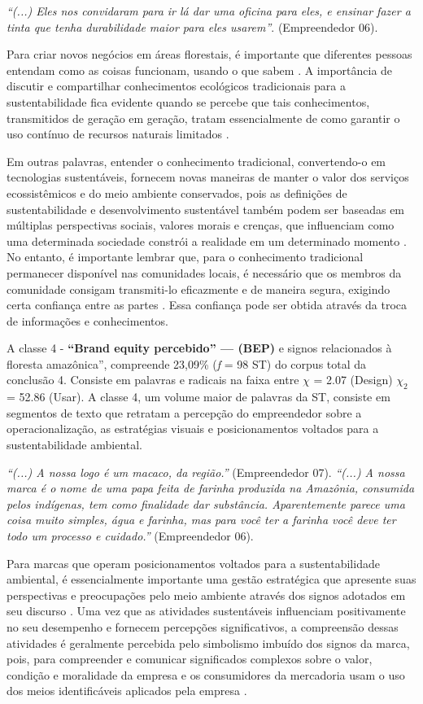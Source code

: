 \textit{“(...) Eles nos convidaram para ir lá dar uma oficina para eles, e ensinar fazer a tinta que tenha durabilidade maior para eles usarem”}. (Empreendedor 06).

Para criar novos negócios em áreas florestais, é importante que diferentes pessoas entendam como as coisas funcionam, usando o que sabem \cite{Nayha2019TransitionSustainability}. A importância de discutir e compartilhar conhecimentos ecológicos tradicionais para a sustentabilidade fica evidente quando se percebe que tais conhecimentos, transmitidos de geração em geração, tratam essencialmente de como garantir o uso contínuo de recursos naturais limitados \cite{Kim2019TraditionalKorea}. 

Em outras palavras, entender o conhecimento tradicional, convertendo-o em tecnologias sustentáveis, fornecem novas maneiras de manter o valor dos serviços ecossistêmicos e do meio ambiente conservados, pois as definições de sustentabilidade e desenvolvimento sustentável também podem ser baseadas em múltiplas perspectivas sociais, valores morais e crenças, que influenciam como uma determinada sociedade constrói a realidade em um determinado momento \cite{Easdale2020StrainsRegion}. No entanto, é importante lembrar que, para o conhecimento tradicional permanecer disponível nas comunidades locais, é necessário que os membros da comunidade consigam transmiti-lo eficazmente e de maneira segura, exigindo certa confiança entre as partes \cite{Berkes2000RediscoveryManagement}. Essa confiança pode ser obtida através da troca de informações e conhecimentos.

A classe 4 - \textbf{“Brand equity percebido” — (BEP)} e signos relacionados à floresta amazônica”, compreende 23,09\% (\textit{f} = 98 ST) do corpus total da conclusão 4. Consiste em palavras e radicais na faixa entre $\chi$ = 2.07 (Design) $\chi_2$ = 52.86 (Usar). A classe 4, um volume maior de palavras da ST, consiste em segmentos de texto que retratam a percepção do empreendedor sobre a operacionalização, as estratégias visuais e posicionamentos voltados para a sustentabilidade ambiental.

\textit{“(...) A nossa logo é um macaco, da região.”} (Empreendedor 07).
\textit{“(...) A nossa marca é o nome de uma papa feita de farinha produzida na Amazônia, consumida pelos indígenas, tem como finalidade dar substância. Aparentemente parece uma coisa muito simples, água e farinha, mas para você ter a farinha você deve ter todo um processo e cuidado.”} (Empreendedor 06).

Para marcas que operam posicionamentos voltados para a sustentabilidade ambiental, é essencialmente importante uma gestão estratégica que apresente suas perspectivas e preocupações pelo meio ambiente através dos signos adotados em seu discurso \cite{Osterwalder2019}. Uma vez que as atividades sustentáveis influenciam positivamente no seu desempenho e fornecem percepções significativos, a compreensão dessas atividades é geralmente percebida pelo simbolismo imbuído dos signos da marca, pois, para compreender e comunicar significados complexos sobre o valor, condição e moralidade da empresa e os consumidores da mercadoria usam o uso dos meios identificáveis aplicados pela empresa \cite{Yu2021CanPremium}.


